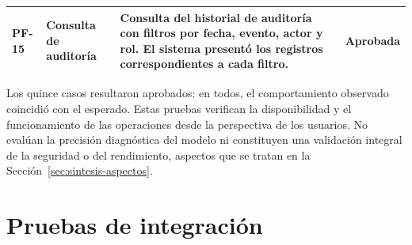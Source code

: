 \begin{nuevotexto}
\begin{longtable}{|p{1.25cm}|p{3.4cm}|p{7.6cm}|p{1.75cm}|}
PF-15 &
Consulta de auditoría &
Consulta del historial de auditoría con filtros por fecha, evento, actor y rol. El sistema presentó los registros correspondientes a cada filtro. &
Aprobada \\
\hline

\end{longtable}
\endgroup

Los quince casos resultaron aprobados: en todos, el comportamiento observado coincidió con el esperado.
Estas pruebas verifican la disponibilidad y el funcionamiento de las operaciones desde la perspectiva de los usuarios.
No evalúan la precisión diagnóstica del modelo ni constituyen una validación integral de la seguridad o del rendimiento, aspectos que se tratan en la Sección~\ref{sec:sintesis-aspectos}.
\end{nuevotexto}

\section{Pruebas de integración}
\label{sec:pruebas_integracion}

